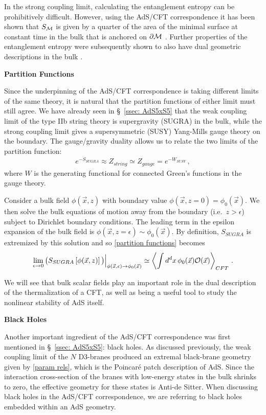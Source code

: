 \documentclass[../PhD.tex]{subfiles}
\begin{document}
In the strong coupling limit, calculating the entanglement entropy can be prohibitively difficult. However, using the AdS/CFT correspondence it has been shown that $S_{\mathcal M}$ is given by a quarter of the area of the minimal surface at constant time in the bulk that is anchored on $\partial \mathcal M$ \cite{hep-th/0603001}. Further properties of the entanglement entropy were subsequently shown to also have dual geometric descriptions in the bulk \cite{1304.4926}.

{\bf Partition Functions}

Since the underpinning of the AdS/CFT correspondence is taking different limits of the same theory, it is natural that the partition functions of either limit must still agree. We have already seen in \S~\!\ref{ssec: AdS5xS5} that the weak coupling limit of the type IIb string theory is supergravity (SUGRA) in the bulk, while the strong coupling limit gives a supersymmetric (SUSY) Yang-Mills gauge theory on the boundary. The gauge/gravity duality allows us to relate the two limits of the partition function:
\begin{align}
\label{partition functions}
e^{-S_{SUGRA}} \approx Z_{string} \simeq Z_{gauge} = e^{-W_{SUSY}} \, ,
\end{align}
where $W$ is the generating functional for connected Green's functions in the gauge theory.

Consider a bulk field $\phi(\vec x,z)$ with boundary value $\phi(\vec x, z=0) = \phi_0 (\vec x)$. We then solve the bulk equations of motion away from the boundary (i.e.~$z > \epsilon$) subject to Dirichlet boundary conditions. The leading term in the epsilon expansion of the bulk field is $\phi(\vec x, z=\epsilon) \sim \phi_0(\vec x)$. By definition, $S_{SUGRA}$ is extremized by this solution and so \eqref{partition functions} becomes \cite{hep-th/9802109, hep-th/9802150}
\begin{align}
\label{ads/cft duality}
\lim_{\epsilon \to 0} \big( S_{SUGRA} \left[ \phi(\vec x, z) \right] \big) \Big|_{\phi (\vec x, \epsilon) \to \phi_0(\vec x)} \simeq \left\langle \int d^dx \, \phi_0(\vec x) \mathcal O(\vec x) \right\rangle_{CFT} \, .
\end{align}

We will see that bulk scalar fields play an important role in the dual description of the thermalization of a CFT, as well as being a useful tool to study the nonlinear stability of AdS itself. 

{\bf Black Holes}

Another important ingredient of the AdS/CFT correspondence was first mentioned in \S~\!\ref{ssec: AdS5xS5}: black holes. As discussed previously, the weak coupling limit of the $N$ D3-branes produced an extremal black-brane geometry given by \eqref{param rels}, which is the Poincar\'e patch description of AdS. Since the interaction cross-section of the branes with low-energy states in the bulk shrinks to zero, the effective geometry for these states is Anti-de Sitter. When discussing black holes in the AdS/CFT correspondence, we are referring to black holes embedded within an AdS geometry. 
\end{document}
